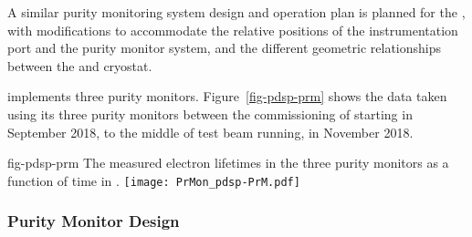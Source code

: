   A similar purity monitoring system design and operation plan is planned for %
  the , with modifications to accommodate the relative positions of the instrumentation port %
  and the purity monitor system, and the %
  different geometric relationships between the  and cryostat.







 implements three purity monitors. 
Figure~\ref{fig-pdsp-prm} shows the  data taken using %
its three purity monitors between the commissioning of  starting in September 2018, to the middle of test beam running, in November 2018. 

\begin{dunefigure}{fig-pdsp-prm}
  {The measured electron lifetimes in the %
  three purity monitors as a function of time in .}
  \texttt{[image: PrMon\_pdsp-PrM.pdf]}
\end{dunefigure}

\subsubsection{Purity Monitor Design}


